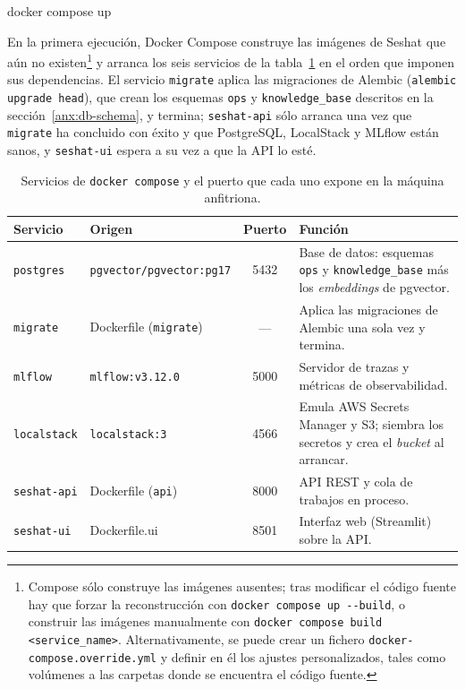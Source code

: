 \begin{center}
  \ttfamily docker compose up
\end{center}

En la primera ejecución, Docker Compose construye las imágenes de Seshat que aún no existen\footnote{%
  Compose sólo construye las imágenes ausentes; tras modificar el código fuente hay que forzar la
  reconstrucción con \texttt{docker compose up -{}-build}, o construir las imágenes manualmente
  con \texttt{docker compose build <service\_name>}. Alternativamente, se puede crear un fichero
  \texttt{docker-compose.override.yml} y definir en él los ajustes personalizados, tales como
  volúmenes a las carpetas donde se encuentra el código fuente. %
} y arranca los seis servicios de la tabla~\ref{tab:compose-services} en el orden que imponen sus
dependencias. El servicio
\texttt{migrate} aplica las migraciones de Alembic (\texttt{alembic upgrade head}), que crean los
esquemas \texttt{ops} y \texttt{knowledge\_base} descritos en la sección~\ref{anx:db-schema}, y
termina; \texttt{seshat-api} sólo arranca una vez que \texttt{migrate} ha concluido con éxito y que
PostgreSQL, LocalStack y MLflow están sanos, y \texttt{seshat-ui} espera a su vez a que la \ac{API}
lo esté.

\begin{table}[H]
  \centering
  \small
  \begin{tabularx}{\textwidth}{@{}l l c >{\raggedright\arraybackslash}X@{}}
    \toprule
    \textbf{Servicio} & \textbf{Origen} & \textbf{Puerto} & \textbf{Función} \\
    \midrule
    \texttt{postgres}   & \texttt{pgvector/pgvector:pg17} & 5432 & Base de datos: esquemas \texttt{ops} y \texttt{knowledge\_base} más los \textit{embeddings} de pgvector. \\
    \texttt{migrate}    & Dockerfile (\texttt{migrate})   & —    & Aplica las migraciones de Alembic una sola vez y termina. \\
    \texttt{mlflow}     & \texttt{mlflow:v3.12.0}         & 5000 & Servidor de trazas y métricas de observabilidad. \\
    \texttt{localstack} & \texttt{localstack:3}           & 4566 & Emula AWS Secrets Manager y S3; siembra los secretos y crea el \textit{bucket} al arrancar. \\
    \texttt{seshat-api} & Dockerfile (\texttt{api})       & 8000 & \ac{API} REST y cola de trabajos en proceso. \\
    \texttt{seshat-ui}  & Dockerfile.ui                   & 8501 & Interfaz web (Streamlit) sobre la \ac{API}. \\
    \bottomrule
  \end{tabularx}
  \caption{Servicios de \texttt{docker compose} y el puerto que cada uno expone en la
           máquina anfitriona.}
  \label{tab:compose-services}
\end{table}

